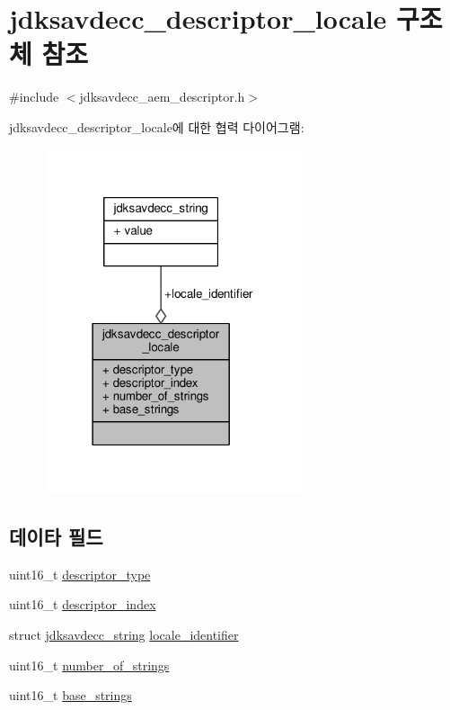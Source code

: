\hypertarget{structjdksavdecc__descriptor__locale}{}\section{jdksavdecc\+\_\+descriptor\+\_\+locale 구조체 참조}
\label{structjdksavdecc__descriptor__locale}


{\ttfamily \#include $<$jdksavdecc\+\_\+aem\+\_\+descriptor.\+h$>$}



jdksavdecc\+\_\+descriptor\+\_\+locale에 대한 협력 다이어그램\+:
\nopagebreak
\begin{figure}[H]
\begin{center}
\leavevmode
\includegraphics[width=214pt]{structjdksavdecc__descriptor__locale__coll__graph}
\end{center}
\end{figure}
\subsection*{데이타 필드}
\begin{DoxyCompactItemize}
\item 
uint16\+\_\+t \hyperlink{structjdksavdecc__descriptor__locale_ab7c32b6c7131c13d4ea3b7ee2f09b78d}{descriptor\+\_\+type}
\item 
uint16\+\_\+t \hyperlink{structjdksavdecc__descriptor__locale_a042bbc76d835b82d27c1932431ee38d4}{descriptor\+\_\+index}
\item 
struct \hyperlink{structjdksavdecc__string}{jdksavdecc\+\_\+string} \hyperlink{structjdksavdecc__descriptor__locale_a9bb3899edf7af17fb64933e1c3ad4f16}{locale\+\_\+identifier}
\item 
uint16\+\_\+t \hyperlink{structjdksavdecc__descriptor__locale_a254c618149fe64f05a5e4ead8d5f046d}{number\+\_\+of\+\_\+strings}
\item 
uint16\+\_\+t \hyperlink{structjdksavdecc__descriptor__locale_a47d2427d6918399e13501f568f55dd26}{base\+\_\+strings}
\end{DoxyCompactItemize}


